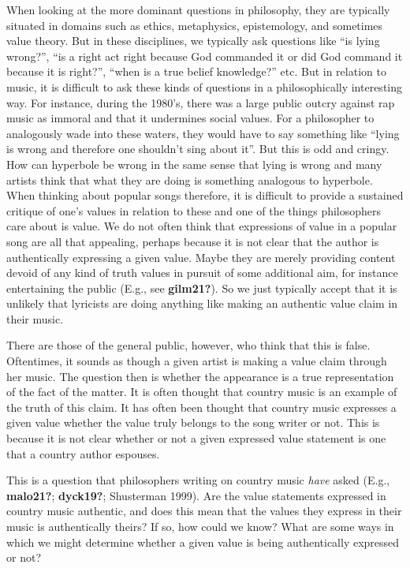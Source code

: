 \documentclass[12pt]{book}
\theoremstyle{definition}
\theoremstyle{remark}
\begin{document}
When looking at the more dominant questions in philosophy, they are typically situated in domains such as ethics, metaphysics, epistemology, and sometimes value theory. But in these disciplines, we typically ask questions like ``is lying wrong?'', ``is a right act right because God commanded it or did God command it because it is right?'', ``when is a true belief knowledge?'' etc. But in relation to music, it is difficult to ask these kinds of questions in a philosophically interesting way. For instance, during the 1980's, there was a large public outcry against rap music as immoral and that it undermines social values. For a philosopher to analogously wade into these waters, they would have to say something like ``lying is wrong and therefore one shouldn't sing about it''. But this is odd and cringy. How can hyperbole be wrong in the same sense that lying is wrong and many artists think that what they are doing is something analogous to hyperbole. When thinking about popular songs therefore, it is difficult to provide a sustained critique of one's values in relation to these and one of the things philosophers care about is value. We do not often think that expressions of value in a popular song are all that appealing, perhaps because it is not clear that the author is authentically expressing a given value. Maybe they are merely providing content devoid of any kind of truth values in pursuit of some additional aim, for instance entertaining the public (E.g., see \textbf{gilm21?}). So we just typically accept that it is unlikely that lyricists are doing anything like making an authentic value claim in their music.

There are those of the general public, however, who think that this is false. Oftentimes, it sounds as though a given artist is making a value claim through her music. The question then is whether the appearance is a true representation of the fact of the matter. It is often thought that country music is an example of the truth of this claim. It has often been thought that country music expresses a given value whether the value truly belongs to the song writer or not. This is because it is not clear whether or not a given expressed value statement is one that a country author espouses.

This is a question that philosophers writing on country music \emph{have} asked (E.g., \textbf{malo21?}; \textbf{dyck19?}; Shusterman 1999). Are the value statements expressed in country music authentic, and does this mean that the values they express in their music is authentically theirs? If so, how could we know? What are some ways in which we might determine whether a given value is being authentically expressed or not?
\end{document}

